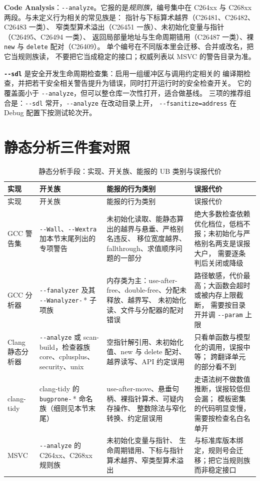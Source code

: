 \documentclass[12pt,a4paper,fontset=fandol]{ctexbook}
\newcommand{\Tp}[1]{\texttt{#1}}
\newcommand{\Opt}[1]{\texttt{-\/-#1}}
\begin{document}
\textbf{Code Analysis}：\Opt{analyze}。它报的是\emph{规则族}，编号集中在
C264xx 与 C268xx 两段。与未定义行为相关的常见族是：
指针与下标算术越界（C26481、C26482、C26483 一类）、
窄类型算术溢出（C26451 一族）、未初始化变量与指针（C26495、C26494 一类）、
返回局部量地址与生命周期错用（C26487 一类）、裸 \Tp{new} 与 \Tp{delete} 配对（C26409）。
单个编号在不同版本里会迁移、合并或改名，把它当规则族读，
不要把它当成稳定的接口；权威列表以 MSVC 的警告目录为准。

\textbf{\Opt{sdl}} 是安全开发生命周期检查集：启用一组缓冲区与调用约定相关的
编译期检查，并把若干安全相关警告提升为错误，同时打开运行时的安全检查开关。
它的覆盖面小于 \Opt{analyze}，但可以整仓库一次性打开，适合做基线。
三项的推荐组合是：\Opt{sdl} 常开，\Opt{analyze} 在改动目录上开，
\Opt{fsanitize=address} 在 Debug 配置下按测试轮次开。

\section{静态分析三件套对照}\label{sec:ub03-static-tools}

\begin{longtable}{@{}>{\raggedright\arraybackslash}p{} >{\raggedright\arraybackslash}p{} >{\raggedright\arraybackslash}p{} >{\raggedright\arraybackslash}p{}@{}}
\caption{静态分析手段：实现、开关族、能报的 UB 类别与误报代价}\label{tab:ub03-static-tools}\\
\toprule
实现 & 开关族 & 能报的行为类别 & 误报代价 \\
\midrule
\endfirsthead
\toprule
实现 & 开关族 & 能报的行为类别 & 误报代价 \\
\midrule
\endhead
\bottomrule
\endfoot
GCC 警告集 & \Opt{Wall}、\Opt{Wextra} 加本节末尾列出的专项警告 &
未初始化读取、能静态算出的越界与悬垂、严格别名违反、
移位宽度越界、fallthrough、求值顺序问题的一部分 &
绝大多数检查依赖优化档位，低档不报；未初始化与严格别名两支是误报大户，
需要逐条判后关闭或降级 \\
GCC 分析器 & \Opt{fanalyzer} 及其 \Opt{Wanalyzer-}\,* 子项族 &
内存类为主：use-after-free、double-free、分配未释放、越界写、
未初始化读、文件与分配器的配对错误 &
路径敏感，代价最高；大函数会超时或被内存上限截断，
需要按目录开并调 \Opt{param} 上限 \\
Clang 静态分析器 & \Opt{analyze} 或 scan-build，检查器族 core、cplusplus、
security、unix & 空指针解引用、未初始化值、new 与 delete 配对、
越界读写、API 约定误用 & 只看单函数与模型化的调用，误报中等；
跨翻译单元的部分看不到 \\
clang-tidy & clang-tidy 的 \Tp{bugprone-}\,* 命名族（细则见本节末尾） &
use-after-move、悬垂句柄、裸指针算术、可疑内存操作、
整数除法与窄化转换、约定层误用 & 走语法树不做数值推断，误报较低但会漏；
模板密集的代码明显变慢，需要按检查名白名单开 \\
MSVC & \Opt{analyze} 的 C264xx、C268xx 规则族 & 未初始化变量与指针、
生命周期错用、下标与指针算术越界、窄类型算术溢出 &
与标准库版本绑定，规则号会迁移；把它当规则族而非稳定接口 \\
\end{longtable}
\end{document}
